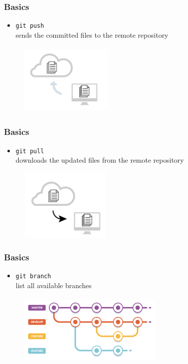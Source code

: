 \documentclass{beamer}
\begin{document}
\begin{frame}[fragile]
\frametitle{Basics}
\begin{itemize}
\item \verb!git push! \\ 
sends the committed files to the remote repository
\end{itemize}
\begin{figure}
\centering
\includegraphics[height=3.5cm, width=4.5cm]{push}
\end{figure}
\end{frame}

\begin{frame}[fragile]
\frametitle{Basics}
\begin{itemize}
\item \verb!git pull! \\ 
downloads the updated files from the remote repository
\end{itemize}
\begin{figure}
\centering
\includegraphics[height=3.5cm, width=4.5cm]{pull}
\end{figure}
\end{frame}

\begin{frame}[fragile]
\frametitle{Basics}
\begin{itemize}
\item \verb!git branch! \\ 
list all available branches
\end{itemize}
\begin{figure}
\centering
\includegraphics[height=3.5cm, width=7cm]{branching}
\end{figure}
\end{frame}
\end{document}
